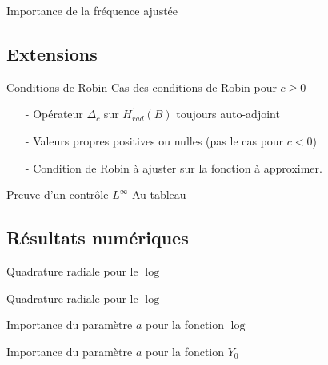 \documentclass[11pt]{beamer}
\theoremstyle{plain}
\theoremstyle{definition}
\newcommand{\Hrad}{H^1_{rad}(B)}
\begin{document}
\begin{frame}{Importance de la fréquence ajustée}
\begingroup
\centering
{}%
%
\endgroup
\end{frame}

\subsection{Extensions}

\begin{frame}{Conditions de Robin}
Cas des conditions de Robin pour $c \geq 0$
\begin{itemize}
\item[-] Opérateur $\Delta_c$ sur $\Hrad$ toujours auto-adjoint 
\item[-] Valeurs propres positives ou nulles (pas le cas pour $c <0$)
\item[-] Condition de Robin à ajuster sur la fonction à approximer. 
\end{itemize}
\end{frame}

\begin{frame}{Preuve d'un contrôle $L^{\infty}$}
Au tableau
\end{frame}

\subsection{Résultats numériques}

\begin{frame}{Quadrature radiale pour le $\log$}
\begingroup
\centering
{}%
%
\endgroup
\end{frame}
\begin{frame}{Quadrature radiale pour le $\log$}
\begingroup
\centering
{}%
%
\endgroup
\end{frame}

\begin{frame}{Importance du paramètre $a$ pour la fonction $\log$}
\begingroup
\centering
{}%
%
\endgroup
\end{frame}
\begin{frame}{Importance du paramètre $a$ pour la fonction $Y_0$}
\begin{center}
\begingroup
\centering
{}%
%
\endgroup
\end{center}

\end{frame}
\end{document}
